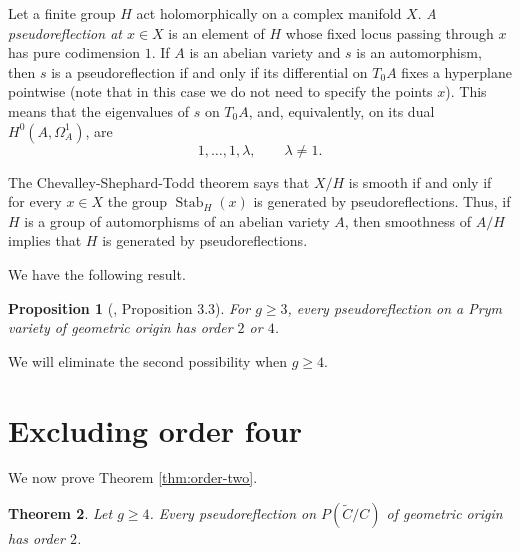 \documentclass[10pt,a4paper]{amsart}
\newtheorem{thm}{Theorem}[section]
\newtheorem{prop}[thm]{Proposition}
\numberwithin{equation}{section}
\begin{document}
Let a finite group $H$ act holomorphically on a complex manifold $X$. \textit{A pseudoreflection at $x\in X$} is an element of $H$ whose fixed locus passing through $x$ has pure codimension $1$. If $A$ is an abelian variety and $s$ is an automorphism, then $s$ is a pseudoreflection if and only if its differential on $T_0A$ fixes a hyperplane pointwise (note that in this case we do not need to specify the points $x$). This means that the eigenvalues of $s$ on $T_0A$, and, equivalently, on its dual $H^0(A,\Omega_A^1)$, are
$$1,\ldots,1,\lambda, \qquad \lambda\neq1.$$

The Chevalley-Shephard-Todd theorem says that $X/H$ is smooth if and only if for every $x \in X$ the group $\operatorname{Stab}_H(x)$ is generated by pseudoreflections. Thus, if $H$ is a group of automorphisms of an abelian variety $A$, then smoothness of $A/H$ implies that $H$ is generated by pseudoreflections.

We have the following result.

\begin{prop}[\cite{ALN}, Proposition 3.3]\label{thm:ALN-orders}
For $g\geq3$, every pseudoreflection on a Prym variety of geometric origin has order $2$ or $4$.
\end{prop}

We will eliminate the second possibility when $g\geq4$.

\section{Excluding order four}\label{sec:order4}

We now prove Theorem \ref{thm:order-two}.

\begin{thm}
\label{thm31}
Let $g\geq 4$. Every pseudoreflection on $P(\widetilde C/C)$ of geometric origin has order $2$.
\end{thm}
\end{document}
